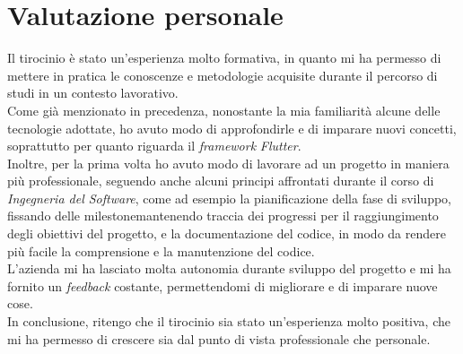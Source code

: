 \section{Valutazione personale}
\label{sec:valutazione-personale}

Il tirocinio è stato un'esperienza molto formativa, in quanto mi ha permesso di mettere in pratica le conoscenze e metodologie acquisite durante il percorso di studi in un contesto lavorativo.\\
Come già menzionato in precedenza, nonostante la mia familiarità alcune delle tecnologie adottate, ho avuto modo di approfondirle e di imparare nuovi concetti, soprattutto per quanto riguarda il \emph{framework} \emph{Flutter}.\\
Inoltre, per la prima volta ho avuto modo di lavorare ad un progetto in maniera più professionale, seguendo anche alcuni principi affrontati durante il corso di \emph{Ingegneria del Software}, come ad esempio la pianificazione della fase di sviluppo, fissando delle \gls{milestone}\glsoccur mantenendo traccia dei progressi per il raggiungimento degli obiettivi del progetto, e la documentazione del codice, in modo da rendere più facile la comprensione e la manutenzione del codice.\\  
L'azienda mi ha lasciato molta autonomia durante sviluppo del progetto e mi ha fornito un \emph{feedback} costante, permettendomi di migliorare e di imparare nuove cose. \\
In conclusione, ritengo che il tirocinio sia stato un'esperienza molto positiva, che mi ha permesso di crescere sia dal punto di vista professionale che personale.